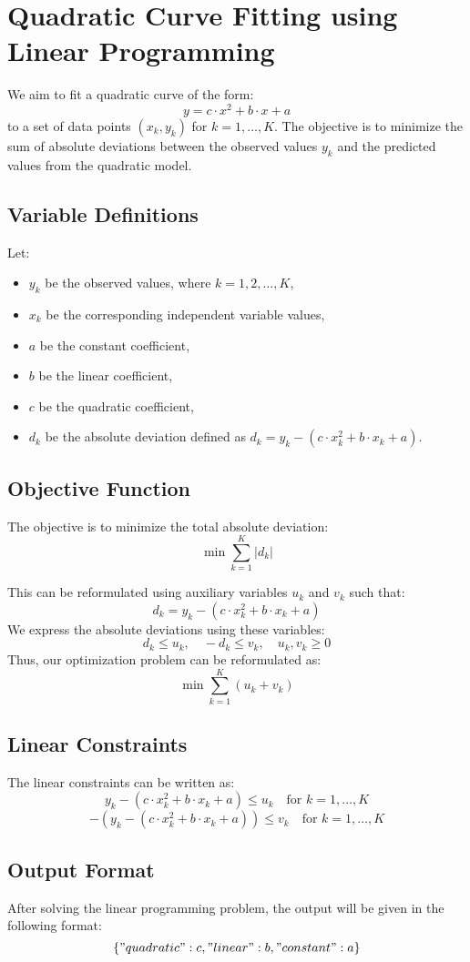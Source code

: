 \documentclass{article}
\begin{document}
\section*{Quadratic Curve Fitting using Linear Programming}

We aim to fit a quadratic curve of the form:
\[
y = c \cdot x^2 + b \cdot x + a
\]
to a set of data points \((x_k, y_k)\) for \(k = 1, \ldots, K\). The objective is to minimize the sum of absolute deviations between the observed values \(y_k\) and the predicted values from the quadratic model.

\subsection*{Variable Definitions}
Let:
\begin{itemize}
    \item \(y_k\) be the observed values, where \(k = 1, 2, \ldots, K\),
    \item \(x_k\) be the corresponding independent variable values,
    \item \(a\) be the constant coefficient,
    \item \(b\) be the linear coefficient,
    \item \(c\) be the quadratic coefficient,
    \item \(d_k\) be the absolute deviation defined as \(d_k = y_k - (c \cdot x_k^2 + b \cdot x_k + a)\).
\end{itemize}

\subsection*{Objective Function}
The objective is to minimize the total absolute deviation:
\[
\min \sum_{k=1}^{K} |d_k|
\]

This can be reformulated using auxiliary variables \(u_k\) and \(v_k\) such that:
\[
d_k = y_k - (c \cdot x_k^2 + b \cdot x_k + a)
\]
We express the absolute deviations using these variables:
\[
d_k \leq u_k, \quad -d_k \leq v_k, \quad u_k, v_k \geq 0
\]
Thus, our optimization problem can be reformulated as:
\[
\min \sum_{k=1}^{K} (u_k + v_k)
\]

\subsection*{Linear Constraints}
The linear constraints can be written as:
\[
y_k - (c \cdot x_k^2 + b \cdot x_k + a) \leq u_k \quad \text{for } k = 1, \ldots, K
\]
\[
-(y_k - (c \cdot x_k^2 + b \cdot x_k + a)) \leq v_k \quad \text{for } k = 1, \ldots, K
\]

\subsection*{Output Format}
After solving the linear programming problem, the output will be given in the following format:
\[
\{ 
    "quadratic": c, 
    "linear": b, 
    "constant": a 
\}
\]
\end{document}
